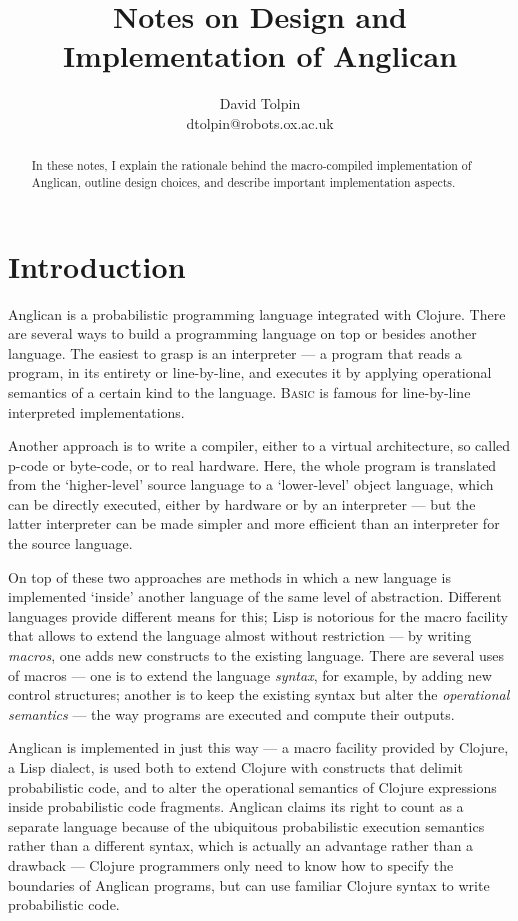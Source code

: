 \documentclass[a4paper]{article}
\title{Notes on Design and Implementation of Anglican}
\author{David Tolpin\\dtolpin@robots.ox.ac.uk}
\begin{document}
\maketitle

\begin{abstract}
	In these notes, I explain the rationale behind the
	macro-compiled implementation of Anglican, outline
	design choices, and describe important implementation
	aspects.
\end{abstract}

\section{Introduction}

Anglican is a probabilistic programming language integrated with
Clojure.  There are several ways to build a programming language
on top or besides another language.  The easiest to grasp is an
interpreter --- a program that reads a program, in its entirety
or line-by-line, and executes it by applying operational
semantics of a certain kind to the language. \textsc{Basic} is
famous for line-by-line interpreted implementations.

Another approach is to write a compiler, either to a virtual
architecture, so called p-code or byte-code, or to real
hardware. Here, the whole program is translated from the
`higher-level' source language to a `lower-level' object
language, which can be directly executed, either by hardware or
by an interpreter --- but the latter interpreter can be made
simpler and more efficient  than an interpreter for the source
language.

On top of these two approaches are methods in which a new
language is implemented `inside' another language of the same
level of abstraction. Different languages provide different
means for this; Lisp is notorious for the macro facility
that allows to extend the language almost without
restriction --- by writing \textit{macros}, one adds new
constructs to the existing language. There are several uses of
macros --- one is to extend the language \textit{syntax}, for
example, by adding new control structures; another is to keep
the existing syntax but alter the \textit{operational semantics}
--- the way programs are executed and compute their outputs.

Anglican is implemented in just this way --- a macro facility
provided by Clojure, a Lisp dialect, is used both to extend
Clojure with constructs that delimit probabilistic code, and to
alter the operational semantics of Clojure expressions inside
probabilistic code fragments. Anglican claims its right to count
as a separate language because of the ubiquitous probabilistic
execution semantics rather than a different syntax,
which is actually an advantage rather than a drawback ---
Clojure programmers only need to know how to specify the
boundaries of Anglican programs, but can use familiar Clojure
syntax to write probabilistic code. 
\end{document}
